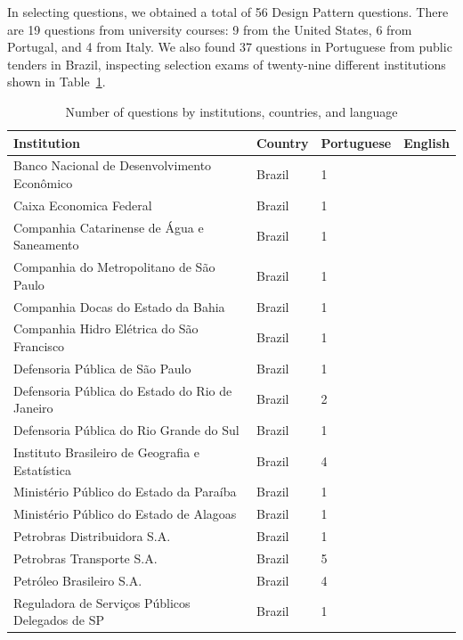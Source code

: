 In selecting questions, we obtained a total of 56 Design Pattern questions. There are 19 questions from university courses: 9 from the United States, 6 from Portugal, and 4 from Italy. We also found 37 questions in Portuguese from public tenders in Brazil, inspecting selection exams of twenty-nine different institutions shown in Table~\ref{table:instituttion}. 

\begin{table}[!ht]
    \scriptsize  
    \centering
    \caption{Number of questions by institutions, countries, and language}
    \label{table:instituttion}
    \begin{tabular}{llll}
        \toprule
        \hline
        \rowcolor{gray!19} \textbf{Institution} & \textbf{Country} & \textbf{Portuguese} & \textbf{English} \\ \hline
        Banco Nacional de Desenvolvimento Econômico & Brazil & 1 & ~ \\
        \rowcolor{gray!19} Caixa Economica Federal & Brazil & 1 & ~ \\ 
        Companhia Catarinense de Água e Saneamento & Brazil & 1 & ~ \\
        \rowcolor{gray!19} Companhia do Metropolitano de São Paulo & Brazil & 1 & ~ \\ 
        Companhia Docas do Estado da Bahia & Brazil & 1 & ~ \\ 
        \rowcolor{gray!19} Companhia Hidro Elétrica do São Francisco & Brazil & 1 & ~ \\ 
        Defensoria Pública de São Paulo & Brazil & 1 & ~ \\ 
        \rowcolor{gray!19} Defensoria Pública do Estado do Rio de Janeiro & Brazil & 2 & ~ \\ 
        Defensoria Pública do Rio Grande do Sul & Brazil & 1 & ~ \\ 
        \rowcolor{gray!19} Instituto Brasileiro de Geografia e Estatística & Brazil & 4 & ~ \\ 
        Ministério Público do Estado da Paraíba & Brazil & 1 & ~ \\ 
        \rowcolor{gray!19} Ministério Público do Estado de Alagoas & Brazil & 1 & ~ \\ 
        Petrobras Distribuidora S.A. & Brazil & 1 & ~ \\ 
        \rowcolor{gray!19} Petrobras Transporte S.A. & Brazil & 5 & ~ \\ 
        Petróleo Brasileiro S.A. & Brazil & 4 & ~ \\ 
        \rowcolor{gray!19} Reguladora de Serviços Públicos Delegados de SP & Brazil & 1 & ~ \\ 

\end{tabular}
\end{table}
